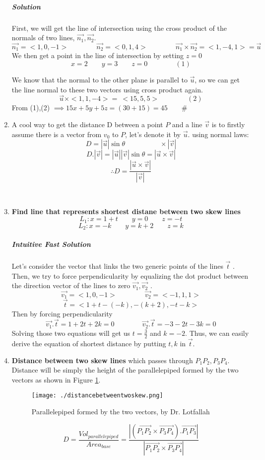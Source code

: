 \documentclass{article}
\begin{document}
\begin{enumerate}[1.]
		\subparagraph{Solution}
		First, we will get the line of intersection using the cross product of the normals of two lines, $ \vec{ n_1}, \vec{ n_2 } $.
		\[
			\vec{ n_1} = <1,0,-1> \qquad \qquad \vec{ n_2 } = <0,1,4> \qquad \qquad \vec{ n_1} \times  \vec{ n_2 } = <1,-4,1> = \vec{ u }
		\]
		We then get a point in the line of intersection by setting $z=0$
		\[
			x=2 \qquad y=3	\qquad z = 0	\qquad \qquad (1)
		\]

		We know that the normal to the other plane is parallel to $ \vec{ u } $, so we can get the line normal to these two vectors using cross product again.
		\[
			\vec{ u } \times <1,1,-4> =\ <15,5,5>	\qquad \qquad (2)
		\]
		From (1),(2) $ \implies 15x+5y+5z = (30+15)=45 \qquad \#
		$




	\item A cool way to get the distance D between a point $P$ and a line $ \vec{ v } $ is to firstly assume there is a vector from $ v_0 $ to $P$, let's denote it by $ \vec{ u } $. using normal laws: 
		\[
			D = | \vec{ u } | \sin{ \theta } \qquad \qquad  \quad \times | \vec{ v } |	
		\]
		\[
			D.| \vec{ v } | = | \vec{ u } | | \vec{ v } | \sin{ \theta } = | \vec{ u } \times \vec{ v } |
		\]
		\[
			\therefore D = \frac{| \vec{ u } \times \vec{ v } | }{ | \vec{ v } |  } 
		\]

		\

	\item \textbf{Find line that represents shortest distane  between two skew lines}
		\[
			L_1: x=1+t \qquad y=0 \qquad z = -t
		\]
		\[
			L_2: x=-k \qquad y=k+2 \qquad z = k
		\]
		\subparagraph{Intuitive Fast Solution}
		Let's consider the vector that links the two generic points of the lines $ \vec{ t } $ . Then, we try to force perpendicularity by equalizing the dot product between the direction vector of the lines to zero $ \vec{ v_1 }, \vec{ v_2 } $ .
		\[
			\vec{ v_1 } = <1,0,-1> \qquad \qquad \vec{ v_2 } = <-1,1,1>
		\]
		\[
			\vec{ t } = <1+t-(-k), -(k+2), -t-k>	
		\]
		Then by forcing perpendicularity
		\[
			\vec{ v_1 }. \vec{ t } = 1+2t+2k=0 \qquad \qquad \vec{ v_2 }. \vec{ t } =-3-2t-3k=0
		\]
		Solving those two equations will get us $t=\frac{3}{2}$ and $ k=-2 $. Thus, we can easily derive the equation of shortest distance by putting $t, k$ in $ \vec{ t } $.  

	\item \textbf{Distance between two skew lines} which passes through $ P_1P_2, P_3P_4 $.
		Distance will be simply the height of the parallelepiped formed by the two vectors as shown in Figure \ref{fig:-distancebetweentwoskew-png}.
		\begin{figure}[h!]
			\centering
			\texttt{[image: ./distancebetweentwoskew.png]}
			\caption{Parallelepiped formed by the two vectors, by Dr. Lotfallah}
			\label{fig:-distancebetweentwoskew-png}
		\end{figure}		
		\[
			D = \frac{ Vol_{parallelepiped} }{ Area_{base} } = \frac{ | ( \vec{ P_1P_2 } \times \vec{ P_3P_4 } ) . \vec{ P_1P_3 } |}{ | \vec{ P_1P_2 } \times  \vec{ P_3P_4 } | } 
		\]


\end{enumerate}
\end{document}
